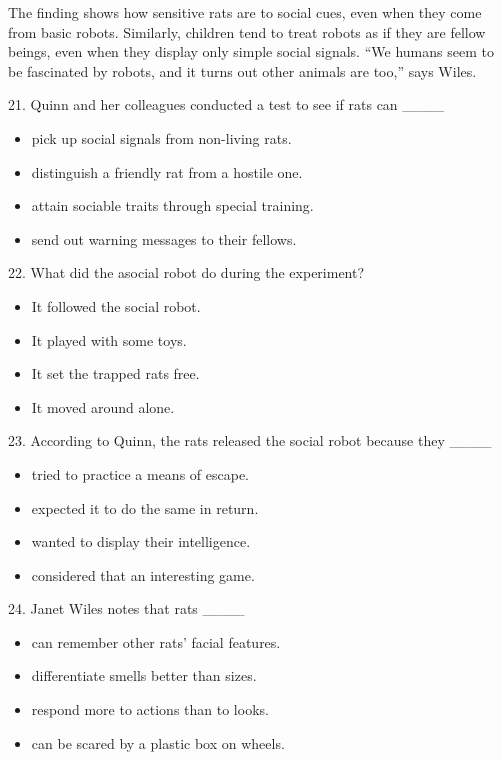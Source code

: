 \documentclass[UTF8,11pt]{ctexart}
\begin{document}
The finding shows how sensitive rats are to social cues, even when they come from basic robots. Similarly, children tend to treat robots as if they are fellow beings, even when they display only simple social signals. “We humans seem to be fascinated by robots, and it turns out other animals are too,” says Wiles.


21. Quinn and her colleagues conducted a test to see if rats can \_\_\_\_


\begin{itemize}[leftmargin=2em,itemsep=.2em,topsep=.4em]\item[A.] pick up social signals from non-living rats.
\item[B.] distinguish a friendly rat from a hostile one.
\item[C.] attain sociable traits through special training.
\item[D.] send out warning messages to their fellows.
\end{itemize}

22. What did the asocial robot do during the experiment?


\begin{itemize}[leftmargin=2em,itemsep=.2em,topsep=.4em]\item[A.] It followed the social robot.
\item[B.] It played with some toys.
\item[C.] It set the trapped rats free.
\item[D.] It moved around alone.
\end{itemize}

23. According to Quinn, the rats released the social robot because they \_\_\_\_


\begin{itemize}[leftmargin=2em,itemsep=.2em,topsep=.4em]\item[A.] tried to practice a means of escape.
\item[B.] expected it to do the same in return.
\item[C.] wanted to display their intelligence.
\item[D.] considered that an interesting game.
\end{itemize}

24. Janet Wiles notes that rats \_\_\_\_


\begin{itemize}[leftmargin=2em,itemsep=.2em,topsep=.4em]\item[A.] can remember other rats’ facial features.
\item[B.] differentiate smells better than sizes.
\item[C.] respond more to actions than to looks.
\item[D.] can be scared by a plastic box on wheels.
\end{itemize}
\end{document}
